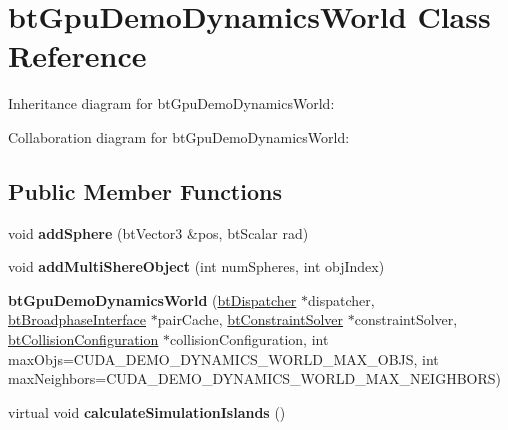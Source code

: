 \hypertarget{classbt_gpu_demo_dynamics_world}{\section{bt\+Gpu\+Demo\+Dynamics\+World Class Reference}
\label{classbt_gpu_demo_dynamics_world}
}


Inheritance diagram for bt\+Gpu\+Demo\+Dynamics\+World\+:


Collaboration diagram for bt\+Gpu\+Demo\+Dynamics\+World\+:
\subsection*{Public Member Functions}
\begin{DoxyCompactItemize}
\item 
\hypertarget{classbt_gpu_demo_dynamics_world_a899bcab2b4ed55bd417fd023cff2933a}{void {\bfseries add\+Sphere} (bt\+Vector3 \&pos, bt\+Scalar rad)}\label{classbt_gpu_demo_dynamics_world_a899bcab2b4ed55bd417fd023cff2933a}

\item 
\hypertarget{classbt_gpu_demo_dynamics_world_ab3ce597c4c43ab94770ab288c50d4a9a}{void {\bfseries add\+Multi\+Shere\+Object} (int num\+Spheres, int obj\+Index)}\label{classbt_gpu_demo_dynamics_world_ab3ce597c4c43ab94770ab288c50d4a9a}

\item 
\hypertarget{classbt_gpu_demo_dynamics_world_a91ce5463cf7c4ef3865196f21669ccf2}{{\bfseries bt\+Gpu\+Demo\+Dynamics\+World} (\hyperlink{classbt_dispatcher}{bt\+Dispatcher} $\ast$dispatcher, \hyperlink{classbt_broadphase_interface}{bt\+Broadphase\+Interface} $\ast$pair\+Cache, \hyperlink{classbt_constraint_solver}{bt\+Constraint\+Solver} $\ast$constraint\+Solver, \hyperlink{classbt_collision_configuration}{bt\+Collision\+Configuration} $\ast$collision\+Configuration, int max\+Objs=C\+U\+D\+A\+\_\+\+D\+E\+M\+O\+\_\+\+D\+Y\+N\+A\+M\+I\+C\+S\+\_\+\+W\+O\+R\+L\+D\+\_\+\+M\+A\+X\+\_\+\+O\+B\+J\+S, int max\+Neighbors=C\+U\+D\+A\+\_\+\+D\+E\+M\+O\+\_\+\+D\+Y\+N\+A\+M\+I\+C\+S\+\_\+\+W\+O\+R\+L\+D\+\_\+\+M\+A\+X\+\_\+\+N\+E\+I\+G\+H\+B\+O\+R\+S)}\label{classbt_gpu_demo_dynamics_world_a91ce5463cf7c4ef3865196f21669ccf2}

\item 
\hypertarget{classbt_gpu_demo_dynamics_world_a8fd9f190b7505aefd5f9a04244c24f5b}{virtual void {\bfseries calculate\+Simulation\+Islands} ()}\label{classbt_gpu_demo_dynamics_world_a8fd9f190b7505aefd5f9a04244c24f5b}


\end{DoxyCompactItemize}
